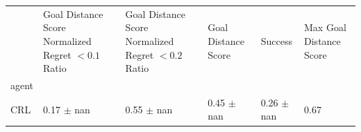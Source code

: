\begin{tabular}{llllll}
\toprule
 & Goal Distance Score Normalized Regret $< 0.1$ Ratio & Goal Distance Score Normalized Regret $< 0.2$ Ratio & Goal Distance Score & Success & Max Goal Distance Score \\
agent &  &  &  &  &  \\
\midrule
CRL & 0.17 $\pm$ nan & 0.55 $\pm$ nan & 0.45 $\pm$ nan & 0.26 $\pm$ nan & 0.67 \\
\bottomrule
\end{tabular}
